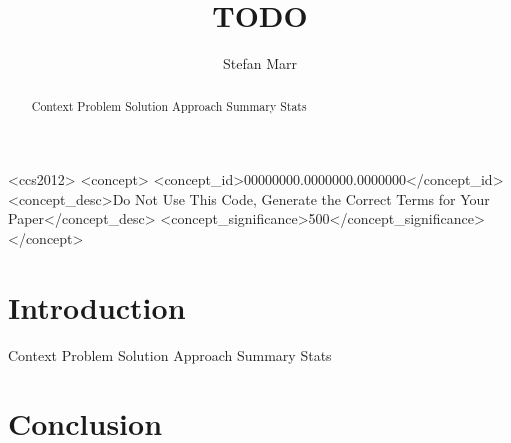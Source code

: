 \documentclass[acmsmall,screen]{acmart}
\begin{document}
\title{TODO}

\author{Stefan Marr}


\begin{abstract}
\begin{note}
  Context
  Problem
  Solution Approach
  Summary Stats
\end{note}
\end{abstract}

\begin{CCSXML}
<ccs2012>
 <concept>
  <concept_id>00000000.0000000.0000000</concept_id>
  <concept_desc>Do Not Use This Code, Generate the Correct Terms for Your Paper</concept_desc>
  <concept_significance>500</concept_significance>
 </concept>
\end{CCSXML}




\maketitle

\section{Introduction}
\begin{note}
  Context
  Problem
  Solution Approach
  Summary Stats
\end{note}









\section{Conclusion}


\begin{acks}
\end{acks}



\end{document}
